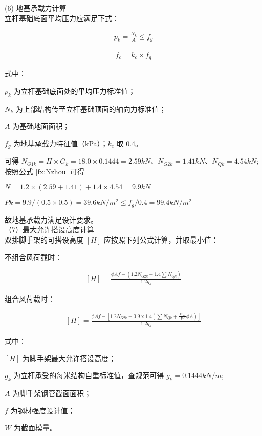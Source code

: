 (6) 地基承载力计算\\

立杆基础底面平均压力应满足下式：

\begin{align}
    p_k=\frac{N_k}{A} \leq f_g
\end{align}

\begin{align}
    f_c=k_c\times f_{g}
\end{align}

式中：

$p_k$ 为立杆基础底面处的平均压力标准值；   

$N_k$ 为上部结构传至立杆基础顶面的轴向力标准值； 

$A$ 为基础地面面积；                       

$f_g$ 为地基承载力特征值（kPa）；$k_c$ 取 0.4。

可得 $N_{G1k}=H\times G_k=18.0\times 0.1444=2.59kN$、$N_{G2k}=1.41kN$、$N_{Qk}=4.54kN$;
按照公式 \ref{fx:Nzhou} 可得

$N=1.2\times (2.59+1.41)+1.4\times 4.54=9.9kN $

$Pk=9.9/(0.5×0.5)=39.6kN/m^2\leq f_g/0.4=99.4kN/m^2$

故地基承载力满足设计要求。\\

（7）最大允许搭设高度计算\\

双排脚手架的可搭设高度 $[H]$ 应按照下列公式计算，并取最小值：

不组合风荷载时：

\begin{align}
    \label{fx:bzh} 
    [H]=\frac{\phi Af-(1.2N_{G2k}+1.4\sum N_{Qk})}{1.2g_k}
\end{align}

组合风荷载时：

\begin{align}
    \label{fx:zh} 
    [H]=\frac{\phi Af-[1.2N_{G2k}+0.9\times 1.4(\sum N_{Qk}+\frac{M_{wk}}{W}\phi A)]}{1.2g_k}
\end{align}

式中：

$[H]$ 为脚手架最大允许搭设高度；

$g_k$ 为立杆承受的每米结构自重标准值，查规范可得 $g_k=0.1444kN/m$;

$A$ 为脚手架钢管截面面积； 

$f$ 为钢材强度设计值； 

$W$ 为截面模量。\\

